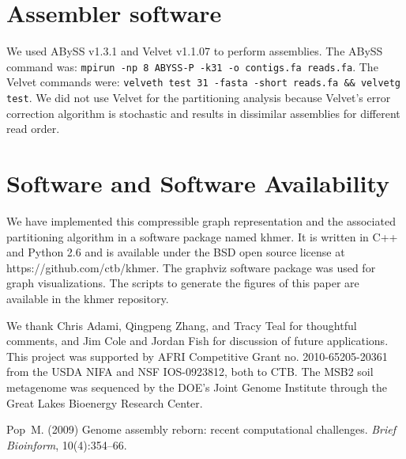 \documentclass{pnastwo}
\begin{document}
\begin{article}
\begin{materials}
\section{Assembler software}

We used ABySS v1.3.1 and Velvet v1.1.07 to perform assemblies.
The ABySS command was: {\tt mpirun -np 8 ABYSS-P -k31 -o contigs.fa reads.fa}.
The Velvet commands were: {\tt velveth test 31 -fasta -short reads.fa \&\& velvetg test}.
We did not use Velvet for the partitioning analysis because Velvet's
error correction algorithm is stochastic and results in dissimilar
assemblies for different read order.

\section{Software and Software Availability}

We have implemented this compressible graph representation and the associated
partitioning algorithm in a
software package named khmer.  It is written in C++ and Python 2.6 and
is available under the BSD open source license at
https://github.com/ctb/khmer.  The graphviz software package was used
for graph visualizations. The scripts to generate the figures of this
paper are available in the khmer repository.

\end{materials}

\begin{acknowledgments}

We thank Chris Adami, Qingpeng Zhang, and Tracy Teal for
thoughtful comments, and Jim Cole and Jordan Fish for discussion of future
applications.  This project was supported by AFRI Competitive Grant
no. 2010-65205-20361 from the USDA NIFA and NSF IOS-0923812, both to CTB.  The
MSB2 soil metagenome was sequenced by the DOE's Joint Genome
Institute through the Great Lakes Bioenergy Research Center.

\end{acknowledgments}


%

%

\begin{thebibliography}{10}

 Pop~M. (2009) Genome assembly reborn: recent 
computational challenges. {\it Brief Bioinform}, 10(4):354--66.


\end{thebibliography}
\end{article}
\end{document}
